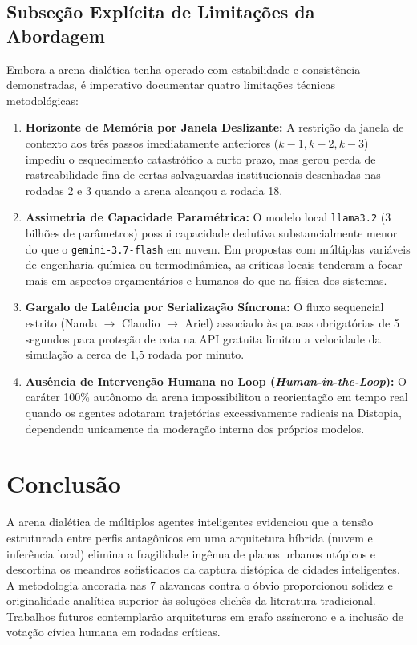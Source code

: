 \documentclass[runningheads]{llncs}
\begin{document}
\subsection{Subse\c{c}\~ao Expl\'icita de Limita\c{c}\~oes da Abordagem}

Embora a arena dial\'etica tenha operado com estabilidade e consist\^encia demonstradas, \'e imperativo documentar quatro limita\c{c}\~oes t\'ecnicas metodol\'ogicas:

\begin{enumerate}
    \item \textbf{Horizonte de Mem\'oria por Janela Deslizante:} A restri\c{c}\~ao da janela de contexto aos tr\^es passos imediatamente anteriores ($k-1, k-2, k-3$) impediu o esquecimento catastr\'ofico a curto prazo, mas gerou perda de rastreabilidade fina de certas salvaguardas institucionais desenhadas nas rodadas 2 e 3 quando a arena alcan\c{c}ou a rodada 18.
    \item \textbf{Assimetria de Capacidade Param\'etrica:} O modelo local \texttt{llama3.2} (3 bilh\~oes de par\^ametros) possui capacidade dedutiva substancialmente menor do que o \texttt{gemini-3.7-flash} em nuvem. Em propostas com m\'ultiplas vari\'aveis de engenharia qu\'imica ou termodin\^amica, as cr\'iticas locais tenderam a focar mais em aspectos or\c{c}ament\'arios e humanos do que na f\'isica dos sistemas.
    \item \textbf{Gargalo de Lat\^encia por Serializa\c{c}\~ao S\'incrona:} O fluxo sequencial estrito (Nanda $\to$ Claudio $\to$ Ariel) associado \`as pausas obrigat\'orias de 5 segundos para prote\c{c}\~ao de cota na API gratuita limitou a velocidade da simula\c{c}\~ao a cerca de 1,5 rodada por minuto.
    \item \textbf{Aus\^encia de Interven\c{c}\~ao Humana no Loop (\emph{Human-in-the-Loop}):} O car\'ater 100\% aut\^onomo da arena impossibilitou a reorienta\c{c}\~ao em tempo real quando os agentes adotaram trajet\'orias excessivamente radicais na Distopia, dependendo unicamente da modera\c{c}\~ao interna dos pr\'oprios modelos.
\end{enumerate}

\section{Conclus\~ao}

A arena dial\'etica de m\'ultiplos agentes inteligentes evidenciou que a tens\~ao estruturada entre perfis antag\^onicos em uma arquitetura h\'ibrida (nuvem e infer\^encia local) elimina a fragilidade ing\^enua de planos urbanos ut\'opicos e descortina os meandros sofisticados da captura dist\'opica de cidades inteligentes. A metodologia ancorada nas 7 alavancas contra o \'obvio proporcionou solidez e originalidade anal\'itica superior \`as solu\c{c}\~oes clich\^es da literatura tradicional. Trabalhos futuros contemplar\~ao arquiteturas em grafo ass\'incrono e a inclus\~ao de vota\c{c}\~ao c\'ivica humana em rodadas cr\'iticas.



\end{document}
